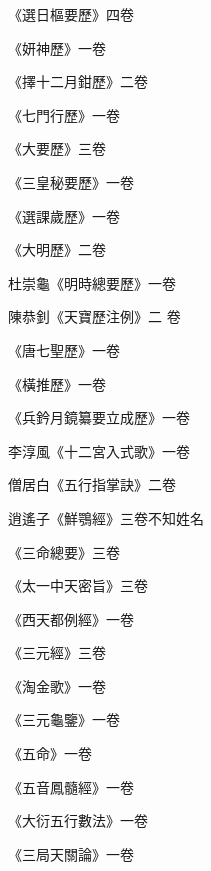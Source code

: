 \begin{pinyinscope}
 《選日樞要歷》四卷



 《妍神歷》一卷



 《擇十二月鉗歷》二卷



 《七門行歷》一卷



 《大要歷》三卷



 《三皇秘要歷》一卷



 《選課歲歷》一卷



 《大明歷》二卷



 杜崇龜《明時總要歷》一卷



 陳恭釗《天寶歷注例》二
 卷



 《唐七聖歷》一卷



 《橫推歷》一卷



 《兵鈐月鏡纂要立成歷》一卷



 李淳風《十二宮入式歌》一卷



 僧居白《五行指掌訣》二卷



 逍遙子《鮮鶚經》三卷不知姓名



 《三命總要》三卷



 《太一中天密旨》三卷



 《西天都例經》一卷



 《三元經》三卷



 《淘金歌》一卷



 《三元龜鑒》一卷



 《五命》一卷



 《五音鳳髓經》一卷



 《大衍五行數法》一卷



 《三局天關論》一卷




\end{pinyinscope}
